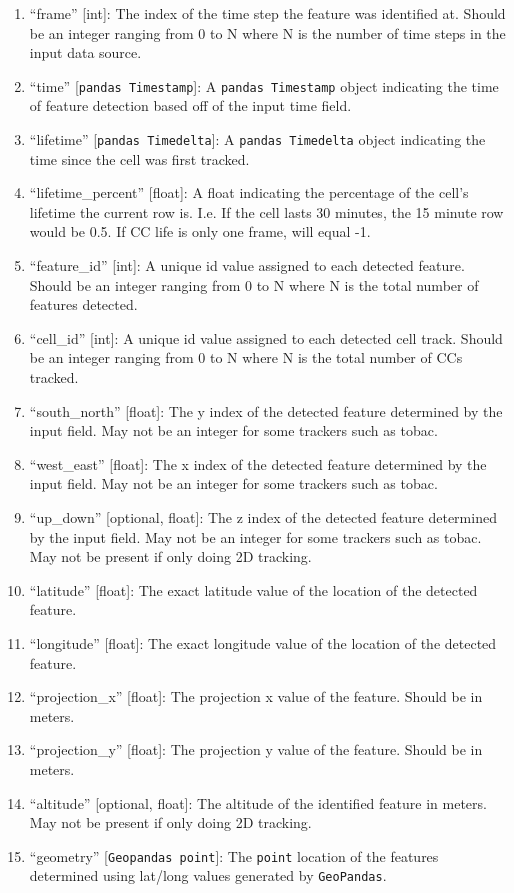 \documentclass[10pt,a4paper]{article}
\begin{document}
	\begin{enumerate}
		\item “frame” [int]:  The index of the time step the feature was identified at. Should be an integer ranging from 0 to N where N is the number of time steps in the input data source.
		\item “time” [\verb|pandas Timestamp|]: A \verb|pandas Timestamp| object indicating the time of feature detection based off of the input time field.
		\item “lifetime” [\verb|pandas Timedelta|]: A \verb|pandas Timedelta| object indicating the time since the cell was first tracked.
		\item “lifetime\_percent” [float]: A float indicating the percentage of the cell’s lifetime the current row is. I.e. If the cell lasts 30 minutes, the 15 minute row would be 0.5. If \ac{CC} life is only one frame, will equal -1.
		\item “feature\_id” [int]: A unique id value assigned to each detected feature. Should be an integer ranging from 0 to N where N is the total number of features detected.
		\item “cell\_id” [int]: A unique id value assigned to each detected cell track. Should be an integer ranging from 0 to N where N is the total number of \ac{CC}s tracked.
		\item “south\_north” [float]: The y index of the detected feature determined by the input field. May not be an integer for some trackers such as tobac.
		\item “west\_east” [float]:  The x index of the detected feature determined by the input field. May not be an integer for some trackers such as tobac.
		\item “up\_down” [optional, float]: The z index of the detected feature determined by the input field. May not be an integer for some trackers such as tobac. May not be present if only doing 2D tracking.
		\item “latitude” [float]: The exact latitude value of the location of the detected feature.
		\item “longitude” [float]: The exact longitude value of the location of the detected feature.
		\item “projection\_x” [float]: The projection x value of the feature. Should be in meters.
		\item “projection\_y” [float]: The projection y value of the feature. Should be in meters.
		\item “altitude” [optional, float]:  The altitude of the identified feature in meters. May not be present if only doing 2D tracking.
		\item “geometry” [\verb|Geopandas point|]: The \verb|point| location of the features determined using lat/long values generated by \verb|GeoPandas|. 
	\end{enumerate} 
	
\end{document}
